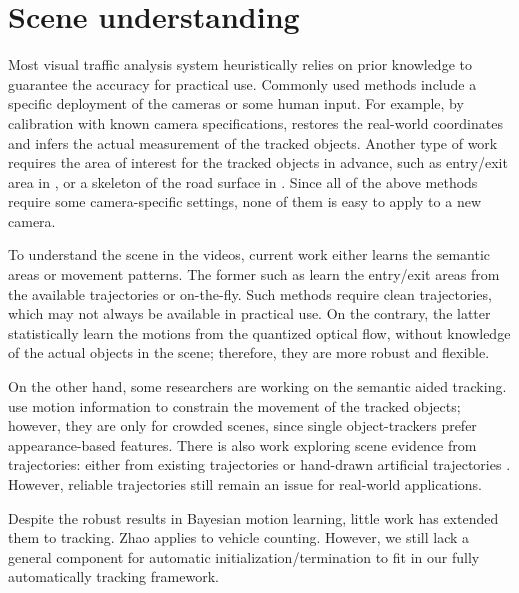 \section{Scene understanding}

\label{sec:semantic-related}
Most visual traffic analysis system heuristically relies on prior knowledge to guarantee the accuracy for practical use. 
Commonly used methods include a specific deployment of the cameras or some human input. 
For example, by calibration with known camera specifications, \cite{cheng2011intelligent,corral2017slot} restores the real-world coordinates and infers the actual measurement of the tracked objects. 
Another type of work requires the area of interest for the tracked objects in advance, such as entry/exit area in \cite{tamersoy2009robust,rodriguez2010adaptive,mishra2013video}, or a skeleton of the road surface in \cite{bas2007automatic}. 
Since all of the above methods require some camera-specific settings, none of them is easy to apply to a new camera.

To understand the scene in the videos, current work either learns the semantic areas or movement patterns. 
The former such as \cite{tung2011goal,nedrich2013detecting,yang2012multi} learn the entry/exit areas from the available trajectories or on-the-fly. 
Such methods require clean trajectories, which may not always be available in practical use.
On the contrary, the latter \cite{wang2009unsupervised,kuettel2010s,hospedales2009markov,liao2015video} statistically learn the motions from the quantized optical flow, without knowledge of the actual objects in the scene; therefore, they are more robust and flexible. 

On the other hand, some researchers are working on the semantic aided tracking. 
\cite{zhao2012tracking,kratz2010tracking} use motion information to constrain the movement of the tracked objects; however, they are only for crowded scenes, since single object-trackers prefer appearance-based features.
There is also work exploring scene evidence from trajectories: either from existing trajectories \cite{song2010online} or hand-drawn artificial trajectories \cite{manen2014appearances}. 
However, reliable trajectories still remain an issue for real-world applications.

Despite the robust results in Bayesian motion learning, little work has extended them to tracking.
Zhao \etc \cite{zhao2013counting} applies \cite{wang2009unsupervised} to vehicle counting. 
However, we still lack a general component for automatic initialization/termination to fit in our fully automatically tracking framework.
